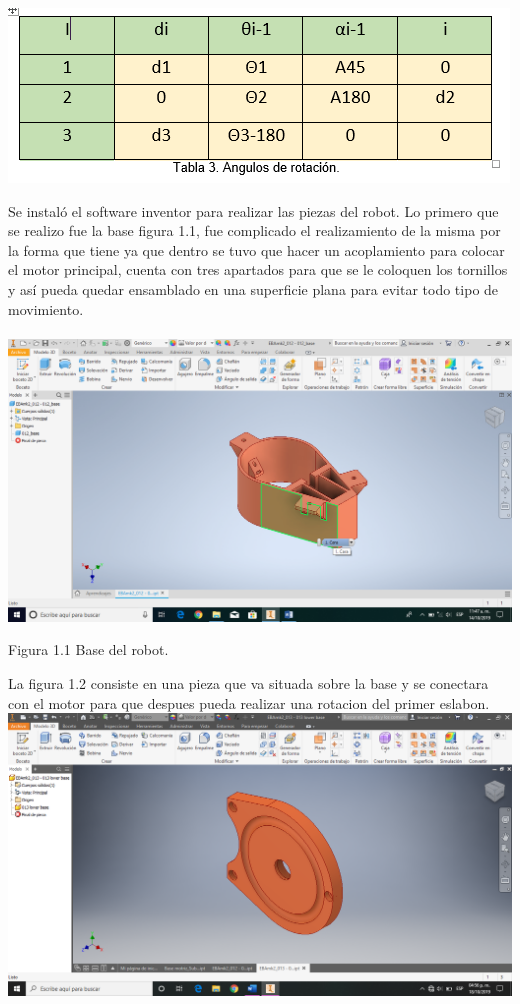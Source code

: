 \documentclass[12pt,letterpaper]{article}
\begin{document}
\begin{center}
\includegraphics[scale=1]{imag7.PNG}
\end{center}

Se instaló el software inventor para realizar las piezas del robot. Lo primero que se realizo fue la base figura 1.1, fue complicado el realizamiento de la misma por la forma que tiene ya que dentro se tuvo que hacer un acoplamiento para colocar el motor principal, cuenta con tres apartados para que se le coloquen los tornillos y así pueda quedar ensamblado en una superficie plana para evitar todo tipo de movimiento.
\\\\
\includegraphics[scale=0.5]{imag8.png} 
\begin{center}
Figura 1.1 Base del robot.
\end{center}
La figura 1.2 consiste en una pieza que va situada sobre la base y se conectara con el motor para que despues pueda realizar una rotacion del primer eslabon.
\newpage
\includegraphics[scale=0.47]{image9.png}  
\end{document}
